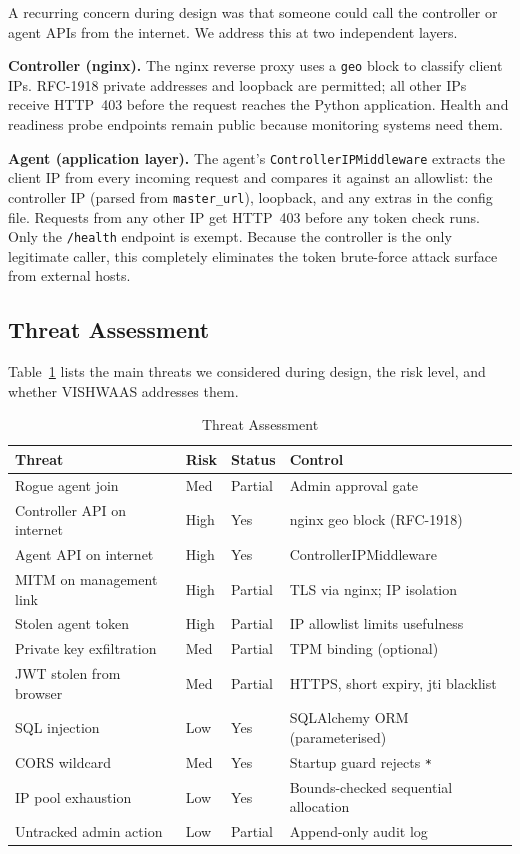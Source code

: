 \documentclass[conference]{IEEEtran}
\begin{document}
A recurring concern during design was that someone could call the controller
or agent APIs from the internet. We address this at two independent layers.

\textbf{Controller (nginx).} The nginx reverse proxy uses a \texttt{geo}
block to classify client IPs. RFC-1918 private addresses and loopback are
permitted; all other IPs receive HTTP~403 before the request reaches the
Python application. Health and readiness probe endpoints remain public
because monitoring systems need them.

\textbf{Agent (application layer).} The agent's
\texttt{ControllerIPMiddleware} extracts the client IP from every incoming
request and compares it against an allowlist: the controller IP (parsed from
\texttt{master\_url}), loopback, and any extras in the config file. Requests
from any other IP get HTTP~403 before any token check runs. Only the
\texttt{/health} endpoint is exempt. Because the controller is the only
legitimate caller, this completely eliminates the token brute-force attack
surface from external hosts.

\subsection{Threat Assessment}

Table~\ref{tab:threats} lists the main threats we considered during design,
the risk level, and whether VISHWAAS addresses them.

\begin{table}[!t]
\caption{Threat Assessment}
\label{tab:threats}
\centering
\small
\begin{tabularx}{\columnwidth}{lllX}
\toprule
\textbf{Threat} & \textbf{Risk} & \textbf{Status} & \textbf{Control} \\
\midrule
Rogue agent join          & Med  & Partial & Admin approval gate \\
Controller API on internet& High & Yes     & nginx geo block (RFC-1918) \\
Agent API on internet     & High & Yes     & ControllerIPMiddleware \\
MITM on management link   & High & Partial & TLS via nginx; IP isolation \\
Stolen agent token        & High & Partial & IP allowlist limits usefulness \\
Private key exfiltration  & Med  & Partial & TPM binding (optional) \\
JWT stolen from browser   & Med  & Partial & HTTPS, short expiry, jti blacklist \\
SQL injection             & Low  & Yes     & SQLAlchemy ORM (parameterised) \\
CORS wildcard             & Med  & Yes     & Startup guard rejects \texttt{*} \\
IP pool exhaustion        & Low  & Yes     & Bounds-checked sequential allocation \\
Untracked admin action    & Low  & Partial & Append-only audit log \\
\bottomrule
\end{tabularx}
\end{table}
\end{document}
